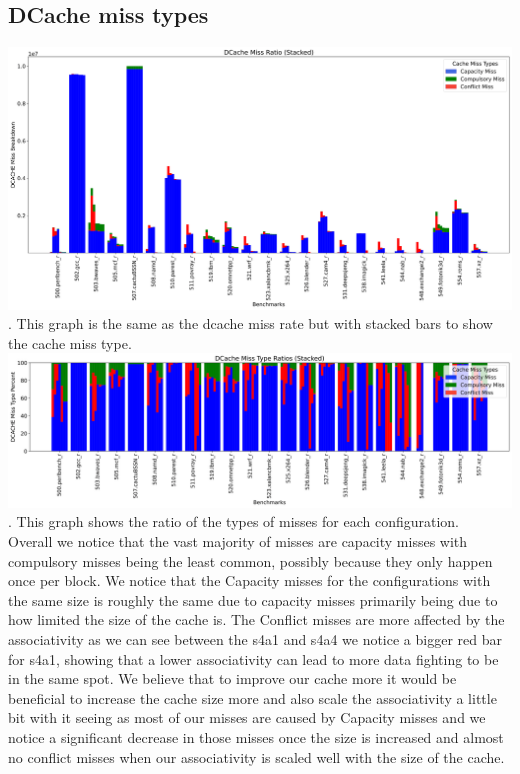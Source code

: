 \documentclass{article}
\begin{document}
\subsection*{DCache miss types}
\includegraphics[width=\textwidth]{Part3_4/DCACHE_MISS_STACKED.png}.
This graph is the same as the dcache miss rate but with stacked bars to show the cache miss type. \\

\includegraphics[width=\textwidth]{Part3_4/DCACHE_MISS_STACKED_RATIO.png}.
This graph shows the ratio of the types of misses for each configuration. \\

Overall we notice that the vast majority of misses are capacity misses with compulsory misses being the least common, possibly because they only happen once per block. We notice that the Capacity misses for the configurations with the same size is roughly the same due to capacity misses primarily being due to how limited the size of the cache is. The Conflict misses are more affected by the associativity as we can see between the s4a1 and s4a4 we notice a bigger red bar for s4a1, showing that a lower associativity can lead to more data fighting to be in the same spot. We believe that to improve our cache more it would be beneficial to increase the cache size more and also scale the associativity a little bit with it seeing as most of our misses are caused by Capacity misses and we notice a significant decrease in those misses once the size is increased and almost no conflict misses when our associativity is scaled well with the size of the cache. \\
\end{document}

